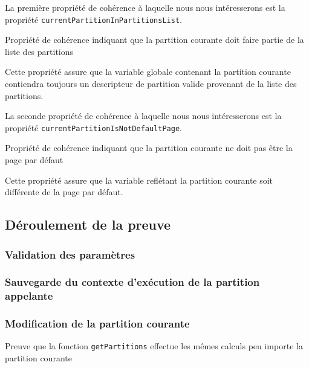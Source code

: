			La première propriété de cohérence à laquelle nous nous intéresserons est la propriété \texttt{currentPartitionInPartitionsList}.

			\begin{listing}[!ht]
				\caption{Propriété de cohérence indiquant que la partition courante doit faire partie de la liste des partitions}
				\label{code:currentPartitionInPartitionsList}
			\end{listing}

			Cette propriété assure que la variable globale contenant la partition courante contiendra toujours un descripteur de partition valide provenant de la liste des partitions.

			La seconde propriété de cohérence à laquelle nous nous intéresserons est la propriété \texttt{currentPartitionIsNotDefaultPage}.

			\begin{listing}[!ht]
				\caption{Propriété de cohérence indiquant que la partition courante ne doit pas être la page par défaut}
				\label{code:currentPartitionIsNotDefaultPage}
			\end{listing}

			Cette propriété assure que la variable reflétant la partition courante soit différente de la page par défaut.
		
		\subsection{Déroulement de la preuve}
			\subsubsection{Validation des paramètres}
			\subsubsection{Sauvegarde du contexte d'exécution de la partition appelante}
			\subsubsection{Modification de la partition courante}

			
			\begin{listing}[!ht]
				\caption{Preuve que la fonction \texttt{getPartitions} effectue les mêmes calculs peu importe la partition courante}
				\label{code:partitionTreeRemains}
			\end{listing}

